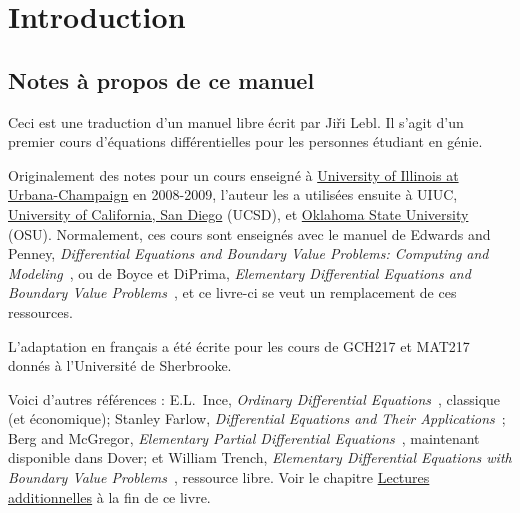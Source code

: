 \chapter*{Introduction} \label{intro:chapter}


\section{Notes \`a propos de ce manuel}
\label{notes:section}

Ceci est une traduction d'un manuel libre écrit par Ji\v{r}i Lebl.  Il s'agit d'un premier cours d'équations diff\'erentielles pour les personnes \'etudiant en g\'enie.

Originalement des notes pour
un cours enseign\'e 
\`a \href{https://www.math.uiuc.edu/}{University of Illinois at
Urbana-Champaign} en 2008-2009, l'auteur  les a utilisées ensuite 
\`a UIUC\@, \href{https://www.math.ucsd.edu/}{University of California, San Diego} (UCSD),
et \href{https://math.okstate.edu/}{Oklahoma State University} (OSU).
Normalement, ces cours sont enseign\'es avec le manuel de 
Edwards and Penney, \emph{Differential
Equations and Boundary Value Problems: Computing and Modeling}~\cite{EP}, ou de Boyce et DiPrima,
\emph{Elementary
Differential Equations and Boundary Value Problems}~\cite{BD},
et ce livre-ci se veut un remplacement de ces ressources.

L'adaptation en français a été écrite pour les cours de GCH217 et MAT217 donnés à l'Université de Sherbrooke.

Voici d'autres références :
E.L.\ Ince,
\emph{Ordinary Differential Equations}~\cite{I}, classique (et \'economique);
Stanley Farlow, \emph{Differential Equations and Their
Applications}~\cite{F}; 
Berg and McGregor,
\emph{Elementary Partial Differential Equations}~\cite{BM}, maintenant disponible dans Dover;
et William Trench,
\emph{Elementary
Differential Equations with Boundary Value Problems}~\cite{T}, ressource libre.
Voir le chapitre \hyperref[furtherreading:chapter]{Lectures additionnelles} \`a la fin de ce livre.

